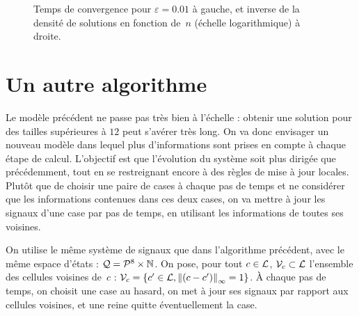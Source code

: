 \begin{figure}[htb]
  \quad
  \caption{Temps de convergence pour $\varepsilon=0.01$ à gauche, et inverse de
    la densité de solutions en fonction de~$n$ (échelle logarithmique) à droite.}
  \label{fig:densite}
\end{figure} 


\section{Un autre algorithme}

Le modèle précédent ne passe pas très bien à l'échelle : obtenir une solution pour des tailles supérieures à $12$ peut s'avérer très long. On va donc envisager un nouveau modèle dans lequel plus d'informations sont prises en compte à chaque étape de calcul. L'objectif est que l'évolution du système soit plus dirigée que précédemment, tout en se restreignant encore à des règles de mise à jour locales. Plutôt que de choisir une paire de cases à chaque pas de temps et ne considérer que les informations contenues dans ces deux cases, on va mettre à jour les signaux d'une case par pas de temps, en utilisant les informations de toutes ses voisines. 

On utilise le même système de signaux que dans l'algorithme précédent, avec le même espace d'états : $\mathcal{Q} = {\mathcal{P}^8}\times\mathbb{N}$. On pose, pour tout $c\in\mathcal{L}$, $\mathcal V_c\subset\mathcal{L}$ l'ensemble des cellules voisines de~$c$ : $\mathcal V_c = \{c' \in \mathcal{L}, \left\lVert(c-c')\right\rVert_\infty = 1\}$.
À chaque pas de temps, on choisit une case au hasard, on met à jour ses signaux par rapport aux cellules voisines, et une reine quitte éventuellement la case. 


